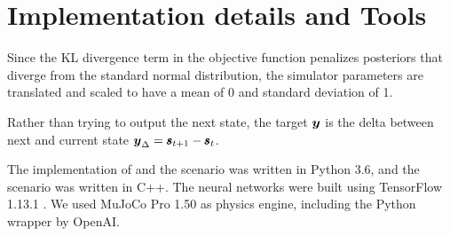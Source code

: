\section{Implementation details and Tools}

Since the KL divergence term in the objective function penalizes posteriors that diverge from the standard normal distribution, the simulator parameters are translated and scaled to have a mean of 0 and standard deviation of 1.

Rather than trying to output the next state, the target $\boldsymbol{y}$ is the delta between next and current state $\boldsymbol{y}_{\Delta} = \pmb{s}_{t+1} - \pmb{s}_t$.

The implementation of \dettostoc{} and the \ws{} scenario was written in Python 3.6, and the \yp{} scenario was written in C++. The neural networks were built using TensorFlow 1.13.1 \parencite{tensorflow2015-whitepaper}. We used MuJoCo Pro 1.50 as physics engine, including the Python wrapper by OpenAI.
